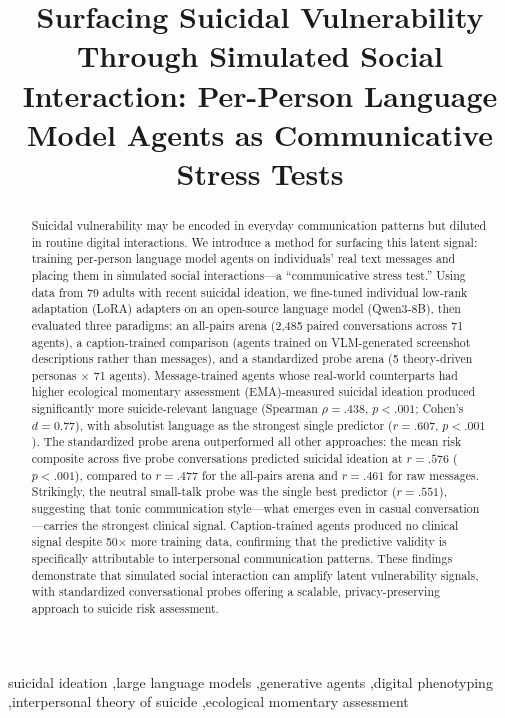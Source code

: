 \documentclass[review,12pt,authoryear]{elsarticle}
\begin{document}
\begin{frontmatter}

\title{Surfacing Suicidal Vulnerability Through Simulated Social Interaction: Per-Person Language Model Agents as Communicative Stress Tests}


\begin{abstract}
Suicidal vulnerability may be encoded in everyday communication patterns but diluted in routine digital interactions. We introduce a method for surfacing this latent signal: training per-person language model agents on individuals' real text messages and placing them in simulated social interactions---a ``communicative stress test.'' Using data from 79 adults with recent suicidal ideation, we fine-tuned individual low-rank adaptation (LoRA) adapters on an open-source language model (Qwen3-8B), then evaluated three paradigms: an all-pairs arena (2,485 paired conversations across 71 agents), a caption-trained comparison (agents trained on VLM-generated screenshot descriptions rather than messages), and a standardized probe arena (5 theory-driven personas $\times$ 71 agents). Message-trained agents whose real-world counterparts had higher ecological momentary assessment (EMA)-measured suicidal ideation produced significantly more suicide-relevant language (Spearman $\rho = .438$, $p < .001$; Cohen's $d = 0.77$), with absolutist language as the strongest single predictor ($r = .607$, $p < .001$). The standardized probe arena outperformed all other approaches: the mean risk composite across five probe conversations predicted suicidal ideation at $r = .576$ ($p < .001$), compared to $r = .477$ for the all-pairs arena and $r = .461$ for raw messages. Strikingly, the neutral small-talk probe was the single best predictor ($r = .551$), suggesting that tonic communication style---what emerges even in casual conversation---carries the strongest clinical signal. Caption-trained agents produced no clinical signal despite 50$\times$ more training data, confirming that the predictive validity is specifically attributable to interpersonal communication patterns. These findings demonstrate that simulated social interaction can amplify latent vulnerability signals, with standardized conversational probes offering a scalable, privacy-preserving approach to suicide risk assessment.
\end{abstract}

\begin{keyword}
suicidal ideation \sep large language models \sep generative agents \sep digital phenotyping \sep interpersonal theory of suicide \sep ecological momentary assessment
\end{keyword}

\end{frontmatter}
\end{document}
